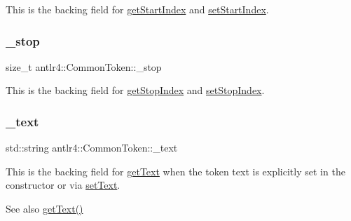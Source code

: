 This is the backing field for \hyperlink{classantlr4_1_1CommonToken_a6addf2e880a348bac29b68f8c919e4a5}{get\+Start\+Index} and \hyperlink{}{set\+Start\+Index}. \mbox{\label{classantlr4_1_1CommonToken_af82f8b915396bde4143d1cc4722373fd}} 
\subsubsection{\texorpdfstring{\+\_\+stop}{\_stop}}
{\footnotesize\ttfamily size\+\_\+t antlr4\+::\+Common\+Token\+::\+\_\+stop\hspace{0.3cm}{\ttfamily [protected]}}

This is the backing field for \hyperlink{classantlr4_1_1CommonToken_ad896be62187eb93d6f0e0e7930d7a500}{get\+Stop\+Index} and \hyperlink{}{set\+Stop\+Index}. \mbox{\label{classantlr4_1_1CommonToken_af99af5ac1af2ef27bc8ac82f92128be8}} 
\subsubsection{\texorpdfstring{\+\_\+text}{\_text}}
{\footnotesize\ttfamily std\+::string antlr4\+::\+Common\+Token\+::\+\_\+text\hspace{0.3cm}{\ttfamily [protected]}}

This is the backing field for \hyperlink{classantlr4_1_1CommonToken_abd1d06568aa3d4aa0180b9ca316ecfcd}{get\+Text} when the token text is explicitly set in the constructor or via \hyperlink{classantlr4_1_1CommonToken_a2963f31fa12fdb1c5c26711004177554}{set\+Text}.

\begin{DoxySeeAlso}{See also}
\hyperlink{classantlr4_1_1CommonToken_abd1d06568aa3d4aa0180b9ca316ecfcd}{get\+Text()} 
\end{DoxySeeAlso}
\mbox{\label{classantlr4_1_1CommonToken_a8901b11131c9b69c76b608bb9a91276a}} 
